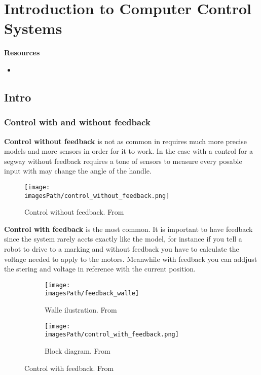 \chapter{Introduction to Computer Control Systems}

\textbf{Resources}
\begin{itemize}
    \item \url{}
\end{itemize}

\newpage

\section{Intro}
\subsection{Control with and without feedback}
\textbf{Control without feedback} is not as common in requires much more
precise models and more sensors in order for it to work. In the case with 
a control for a segway without feedback requires a tone of sensors to measure
every posable input with may change the angle of the handle.

\begin{figure}[!h]
    \centering
    \texttt{[image: \\imagesPath/control\_without\_feedback.png]}
    \caption{Control without feedback. From \cite{}}
\end{figure}

\textbf{Control with feedback} is the most common. It is important to have feedback 
since the system rarely accts exactly like the model, for instance if you tell a robot
to drive to a marking and without feedback you have to calculate the voltage needed to
apply to the motors. Meanwhile with feedback you can addjust the stering and voltage 
in reference with the current position.
\begin{figure}[!h]
     \centering
     \begin{subfigure}[b]{0.3\textwidth}
         \centering
         \texttt{[image: \\imagesPath/feedback\_walle]}
         \caption{Walle ilustration. From \cite{}}
         \label{fig:y equals x}
     \end{subfigure}
     \hfill
     \begin{subfigure}[b]{0.6\textwidth}
         \centering
         \texttt{[image: \\imagesPath/control\_with\_feedback.png]}
         \caption{Block diagram. From \cite{}}
         \label{fig:three sin x}
     \end{subfigure}
        \caption{Control with feedback. From \cite{}}
        \label{fig:control_with_feedback}
\end{figure}

